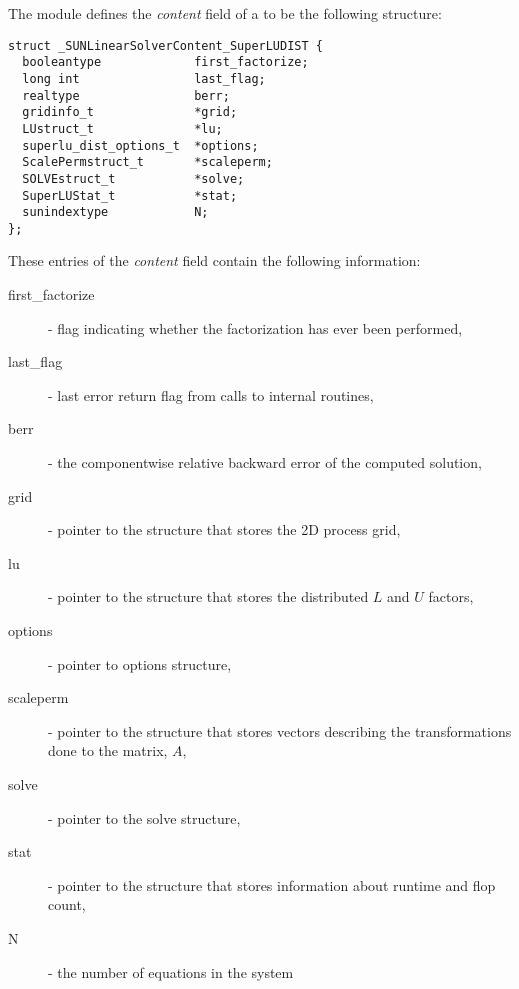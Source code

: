 The {\sunlinsolsludist} module defines the {\em
content} field of a  to be the following structure:
\begin{verbatim} 
struct _SUNLinearSolverContent_SuperLUDIST {
  booleantype             first_factorize;
  long int                last_flag;
  realtype                berr;
  gridinfo_t              *grid;
  LUstruct_t              *lu;
  superlu_dist_options_t  *options;
  ScalePermstruct_t       *scaleperm;
  SOLVEstruct_t           *solve;
  SuperLUStat_t           *stat;
  sunindextype            N;
};
\end{verbatim}
These entries of the \emph{content} field contain the following
information:
\begin{description}
  \item[first\_factorize] - flag indicating whether the factorization
    has ever been performed,
  \item[last\_flag] - last error return flag from calls to internal routines,
  \item[berr] - the componentwise relative backward error of the computed solution,
  \item[grid] - pointer to the {\superludist} structure that stores the 2D process grid,
  \item[lu] - pointer to the {\superludist} structure that stores the distributed $L$
    and $U$ factors,
  \item[options] - pointer to {\superludist} options structure,
  \item[scaleperm] - pointer to the {\superludist} structure that stores vectors describing
    the transformations done to the matrix, $A$,
  \item[solve] - pointer to the {\superludist} solve structure,
  \item[stat] - pointer to the {\superludist} structure that stores information about runtime
    and flop count,
  \item[N] - the number of equations in the system
\end{description}

